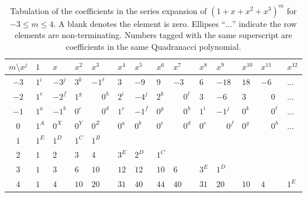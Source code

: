 \documentclass[review]{elsarticle}
\theoremstyle{plain}
\begin{document}
\newpage
\begin{table}[!htb]
\centering
{\begin{tabular}{|c|lllllllllllll|}
\hline
$m \setminus x^j$ & $1$ & $x$ & $x^2$ & $x^3$ & $x^4$ & $x^5$ & $x^6$ & $x^7$ & $x^8$ & $x^9$ & $x^{10}$ & $x^{11}$ & $x^{12}$ \\ \hline
$-3$ & $1^i$  & $-3^j$  & $3^k$  & $-1^\ell$  & $3^{\;}$  & $-9^{\;}$  & $9^{\;}$  & $-3^{\;}$  & $6^{\;}$  & $-18^{\;}$  & $18^{\;}$  & $-6^{\;}$ & $\dots$ \\ 
$-2$ & $1^e$  & $-2^f$  & $1^g$  & $\phantom{-}0^h$  & $2^i$  & $-4^j$  & $2^k$  & $\phantom{-}0^\ell$  & $3^{\;}$  & $-6^{\;}$  & $3^{\;}$  & $\phantom{-}0^{\;}$ & $\dots$ \\
$-1$ & $1^a$  & $-1^b$  & $0^c$  & $\phantom{-}0^d$  & $1^e$  & $-1^f$  & $0^g$  & $\phantom{-}0^h$  & $1^i$  & $-1^j$  & $0^k$  & $\phantom{-}0^\ell$ & $\dots$ \\
$0$ & $1^A$ & $0^X$ & $0^Y$ & $0^Z$ & $0^a$ & $0^b$ & $0^c$ & $\phantom{-}0^d$ & $0^e$ & $\phantom{-}0^f$ & $0^g$ & $\phantom{-}0^h$ & $\dots$ \\
$1$ & $1^E$ & $1^D$ & $1^C$ & $1^B$ &&&&&&&&& \\
$2$ & $1$ & $2$ & $3$ & $4$ & $3^E$ & $2^D$ & $1^C$ &&&&&& \\
$3$ & $1$ & $3$ & $6$ & $10$ & $12$ & $12$ & $10$ & $6$ & $3^E$ & $1^D$ &&& \\
$4$ & $1$ & $4$ & $10$ & $20$ & $31$ & $40$ & $44$ & $40$ & $31$ & $20$ & $10$ & $4$ & $1^E$ \\ \hline	
\end{tabular}}
\caption{\label{tb:tbl_k4}
Tabulation of the coefficients in the series expansion of $(1+x+x^2+x^3)^m$ for $-3\le m \le 4$.
A blank denotes the element is zero.
Ellipses ``$\dots$'' indicate the row elements are non-terminating.
Numbers tagged with the same superscript are coefficients in the same Quadranacci polynomial.}
\end{table}
\end{document}
